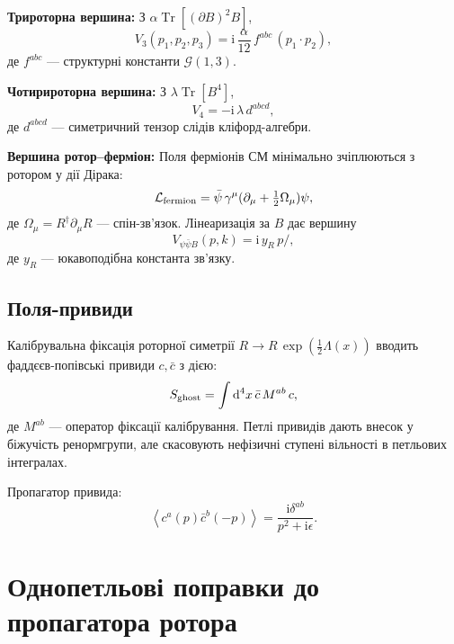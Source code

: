 \documentclass[11pt,a4paper]{article}
\numberwithin{equation}{section}
\theoremstyle{plain}
\theoremstyle{definition}
\theoremstyle{remark}
\DeclareMathOperator{\Tr}{Tr}
\newcommand{\dd}{\mathrm{d}}
\newcommand{\ii}{\mathrm{i}}
\newcommand{\avg}[1]{\left\langle #1 \right\rangle}
\newcommand{\Cl}{\mathcal{G}}               %
\newcommand{\Lag}{\mathcal{L}}              %
\begin{document}
\textbf{Трироторна вершина:} З $\alpha\Tr[(\partial B)^2 B]$,
\begin{equation}
V_3(p_1,p_2,p_3) = \ii\,\frac{\alpha}{12}\,f^{abc}\,(p_1\cdot p_2),
\label{eq:V3}
\end{equation}
де $f^{abc}$ — структурні константи $\Cl(1,3)$.

\textbf{Чотирироторна вершина:} З $\lambda\Tr[B^4]$,
\begin{equation}
V_4 = -\ii\,\lambda\,d^{abcd},
\label{eq:V4}
\end{equation}
де $d^{abcd}$ — симетричний тензор слідів кліфорд-алгебри.

\textbf{Вершина ротор–ферміон:} Поля ферміонів СМ мінімально зчіплюються з ротором у дії Дірака:
\begin{equation}
\Lag_{\rm fermion} = \bar\psi\,\gamma^\mu(\partial_\mu + \tfrac12 \Omega_\mu)\psi,
\label{eq:L-fermion}
\end{equation}
де $\Omega_\mu = R^\dagger \partial_\mu R$ — спін-зв'язок. Лінеаризація за $B$ дає вершину
\begin{equation}
V_{\psi\bar\psi B}(p,k) = \ii\,y_R\,p\!\!\!/,
\label{eq:V-fermion}
\end{equation}
де $y_R$ — юкавоподібна константа зв'язку.

\subsection{Поля-привиди}

Калібрувальна фіксація роторної симетрії $R\to R\,\exp(\tfrac12\Lambda(x))$ вводить фаддєєв-попівські привиди $c,\bar c$ з дією:
\begin{equation}
S_{\rm ghost} = \int \dd^4x\,\bar c\,M^{ab}\,c,
\label{eq:S-ghost}
\end{equation}
де $M^{ab}$ — оператор фіксації калібрування. Петлі привидів дають внесок у біжучість ренормгрупи, але скасовують нефізичні ступені вільності в петльових інтегралах.

Пропагатор привида:
\begin{equation}
\avg{c^a(p)\bar c^b(-p)} = \frac{\ii\delta^{ab}}{p^2+\ii\epsilon}.
\label{eq:prop-ghost}
\end{equation}

\vspace{1em}

\section{Однопетльові поправки до пропагатора ротора}\label{sec:oneloop}
\end{document}
